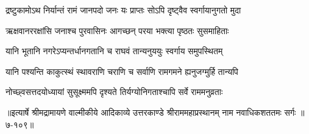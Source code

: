 \twolineshloka
{द्रष्टुकामोऽथ निर्यान्तं रामं जानपदो जनः}
{यः प्राप्तः सोऽपि दृष्ट्वैव स्वर्गायानुगतो मुदा} %

\twolineshloka
{ऋक्षवानररक्षांसि जनाश्च पुरवासिनः}
{आगच्छन् परया भक्त्या पृष्ठतः सुसमाहिताः} %

\twolineshloka
{यानि भूतानि नगरेऽप्यन्तर्धानगतानि च}
{राघवं तान्यनुययुः स्वर्गाय समुपस्थितम्} %

\twolineshloka
{यानि पश्यन्ति काकुत्स्थं स्थावराणि चराणि च}
{सर्वाणि रामगमने ह्यनुजग्मुर्हि तान्यपि} %

\twolineshloka
{नोच्छ्वसत्तदयोध्यायां सुसूक्ष्ममपि दृश्यते}
{तिर्यग्योनिगताश्चापि सर्वे राममनुव्रताः} %


॥इत्यार्षे श्रीमद्रामायणे वाल्मीकीये आदिकाव्ये उत्तरकाण्डे श्रीराममहाप्रस्थानम् नाम नवाधिकशततमः सर्गः ॥७-१०९॥

